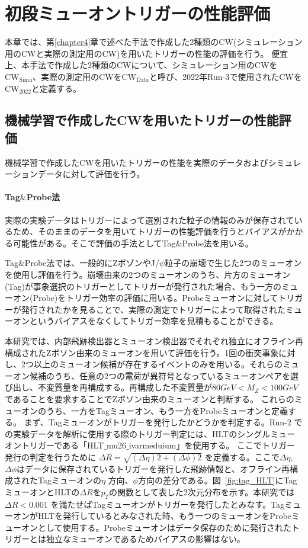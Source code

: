 \chapter{初段ミューオントリガーの性能評価}\label{chapter5}
本章では、第\ref{chapter4}章で述べた手法で作成した2種類のCW(シミュレーション用のCWと実際の測定用のCW)を用いたトリガーの性能の評価を行う。
便宜上、本手法で作成した2種類のCWについて、シミュレーション用のCWを$\mathrm{CW_{Simu}}$、実際の測定用のCWを$\mathrm{CW_{Data}}$と呼び、2022年Run-3で使用されたCWを$\mathrm{CW_{2022}}$と定義する。

\section{機械学習で作成したCWを用いたトリガーの性能評価}
機械学習で作成したCWを用いたトリガーの性能を実際のデータおよびシミュレーションデータに対して評価を行う。
\subsubsection{Tag$\&$Probe法}
実際の実験データはトリガーによって選別された粒子の情報のみが保存されているため、そのままのデータを用いてトリガーの性能評価を行うとバイアスがかかる可能性がある。そこで評価の手法としてTag$\&$Probe法を用いる。

Tag$\&$Probe法では、一般的にZボゾンやJ/$\psi$粒子の崩壊で生じた2つのミューオンを使用し評価を行う。崩壊由来の2つのミューオンのうち、片方のミューオン(Tag)が事象選択のトリガーとしてトリガーが発行された場合、もう一方のミューオン(Probe)をトリガー効率の評価に用いる。Probeミューオンに対してトリガーが発行されたかを見ることで、実際の測定でトリガーによって取得されたミューオンというバイアスをなくしてトリガー効率を見積もることができる。

本研究では、内部飛跡検出器とミューオン検出器でそれぞれ独立にオフライン再構成されたZボソン由来のミューオンを用いて評価を行う。1回の衝突事象に対し、2つ以上のミューオン候補が存在するイベントのみを用いる。それらのミューオン候補のうち、任意の2つの電荷が異符号となっているミューオンペアを選び出し、不変質量を再構成する。再構成した不変質量が$80 GeV < M_Z < 100 GeV$ であることを要求することでZボソン由来のミューオンと判断する。
これらのミューオンのうち、一方をTagミューオン、もう一方をProbeミューオンと定義する。
まず、Tagミューオンがトリガーを発行したかどうかを判定する。Run-2 での実験データを解析に使用する際のトリガー判定には、HLTのシングルミューオントリガーである「HLT$\_$mu26$\_$ivarmeduium」を使用する。
ここでトリガー発行の判定を行うために $\Delta R = \sqrt{(\Delta \eta)2 + (\Delta \phi)2}$ を定義する。ここで$\Delta \eta$, $\Delta \phi$はデータに保存されているトリガーを発行した飛跡情報と、オフライン再構成されたTagミューオンの$\eta$ 方向、$\phi$方向の差分である。図~\ref{fig:tag_HLT}にTag ミューオンとHLTの$\Delta R$を$p_T$の関数として表した2次元分布を示す。本研究では$\Delta R < 0.001$ を満たせばTagミューオンがトリガーを発行したとみなす。TagミューオンがHLTを発行しているとみなされた時、もう一つのミューオンをProbeミューオンとして使用する。Probeミューオンはデータ保存のために発行されたトリガーとは独立なミューオンであるためバイアスの影響はない。

